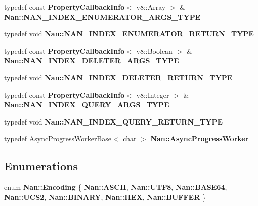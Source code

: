 \begin{DoxyCompactItemize}
\item 
typedef const \textbf{ Property\+Callback\+Info}$<$ v8\+::\+Array $>$ \& \textbf{ Nan\+::\+N\+A\+N\+\_\+\+I\+N\+D\+E\+X\+\_\+\+E\+N\+U\+M\+E\+R\+A\+T\+O\+R\+\_\+\+A\+R\+G\+S\+\_\+\+T\+Y\+PE}
\item 
typedef void \textbf{ Nan\+::\+N\+A\+N\+\_\+\+I\+N\+D\+E\+X\+\_\+\+E\+N\+U\+M\+E\+R\+A\+T\+O\+R\+\_\+\+R\+E\+T\+U\+R\+N\+\_\+\+T\+Y\+PE}
\item 
typedef const \textbf{ Property\+Callback\+Info}$<$ v8\+::\+Boolean $>$ \& \textbf{ Nan\+::\+N\+A\+N\+\_\+\+I\+N\+D\+E\+X\+\_\+\+D\+E\+L\+E\+T\+E\+R\+\_\+\+A\+R\+G\+S\+\_\+\+T\+Y\+PE}
\item 
typedef void \textbf{ Nan\+::\+N\+A\+N\+\_\+\+I\+N\+D\+E\+X\+\_\+\+D\+E\+L\+E\+T\+E\+R\+\_\+\+R\+E\+T\+U\+R\+N\+\_\+\+T\+Y\+PE}
\item 
typedef const \textbf{ Property\+Callback\+Info}$<$ v8\+::\+Integer $>$ \& \textbf{ Nan\+::\+N\+A\+N\+\_\+\+I\+N\+D\+E\+X\+\_\+\+Q\+U\+E\+R\+Y\+\_\+\+A\+R\+G\+S\+\_\+\+T\+Y\+PE}
\item 
typedef void \textbf{ Nan\+::\+N\+A\+N\+\_\+\+I\+N\+D\+E\+X\+\_\+\+Q\+U\+E\+R\+Y\+\_\+\+R\+E\+T\+U\+R\+N\+\_\+\+T\+Y\+PE}
\item 
typedef Async\+Progress\+Worker\+Base$<$ char $>$ \textbf{ Nan\+::\+Async\+Progress\+Worker}
\end{DoxyCompactItemize}
\subsection*{Enumerations}
\begin{DoxyCompactItemize}
\item 
enum \textbf{ Nan\+::\+Encoding} \{ \newline
\textbf{ Nan\+::\+A\+S\+C\+II}, 
\textbf{ Nan\+::\+U\+T\+F8}, 
\textbf{ Nan\+::\+B\+A\+S\+E64}, 
\textbf{ Nan\+::\+U\+C\+S2}, 
\newline
\textbf{ Nan\+::\+B\+I\+N\+A\+RY}, 
\textbf{ Nan\+::\+H\+EX}, 
\textbf{ Nan\+::\+B\+U\+F\+F\+ER}
 \}
\end{DoxyCompactItemize}
